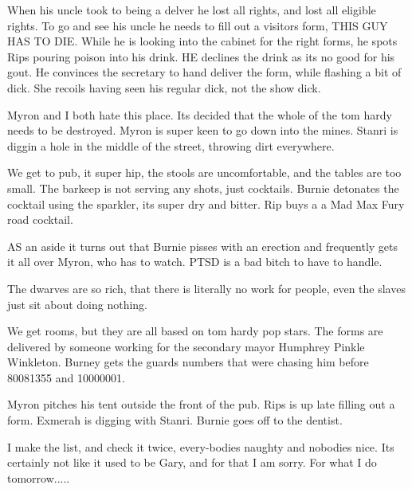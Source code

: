 When his uncle took to being a delver he lost all rights, and lost all eligible rights. To go and see his uncle he needs to fill out a visitors form, THIS GUY HAS TO DIE. While he is looking into the cabinet for the right forms, he spots Rips pouring poison into his drink. HE declines the drink as its no good for his gout. He convinces the secretary to hand deliver the form, while flashing a bit of dick. She recoils having seen his regular dick, not the show dick.\medskip

Myron and I both hate this place. Its decided that the whole of the tom hardy needs to be destroyed. Myron is super keen to go down into the mines. Stanri is diggin a hole in the middle of the street, throwing dirt everywhere.\medskip

We get to pub, it super hip, the stools are uncomfortable, and the tables are too small. The barkeep is not serving any shots, just cocktails. Burnie detonates the cocktail using the sparkler, its super dry and bitter. Rip buys a a Mad Max Fury road cocktail.\medskip

AS an aside it turns out that Burnie pisses with an erection and frequently gets it all over Myron, who has to watch. PTSD is a bad bitch to have to handle.\medskip

The dwarves are so rich, that there is literally no work for people, even the slaves just sit about doing nothing.\medskip

We get rooms, but they are all based on tom hardy pop stars. The forms are delivered by someone working for the secondary mayor Humphrey Pinkle Winkleton. Burney gets the guards numbers that were chasing him before 80081355 and 10000001.\medskip

Myron pitches his tent outside the front of the pub. Rips is up late filling out a form. Exmerah is digging with Stanri. Burnie goes off to the dentist.\medskip

I make the list, and check it twice, every-bodies naughty and nobodies nice. Its certainly not like it used to be Gary, and for that I am sorry. For what I do tomorrow.....\medskip




\vspace*{5mm}

